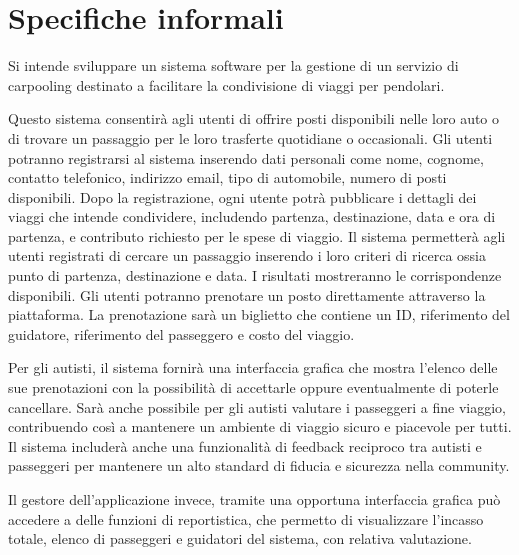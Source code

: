 \section {Specifiche informali}

Si intende sviluppare un sistema software per la gestione di un servizio di carpooling destinato a facilitare la condivisione di viaggi per pendolari. 

Questo sistema consentirà agli utenti di offrire posti disponibili nelle loro auto o di trovare un passaggio per le loro trasferte quotidiane o occasionali.
Gli utenti potranno registrarsi al sistema inserendo dati personali come nome, cognome, contatto telefonico, indirizzo email, tipo di automobile, numero di posti disponibili. Dopo la registrazione, ogni utente potrà pubblicare i dettagli dei viaggi che intende condividere, includendo partenza, destinazione, data e ora di partenza, e contributo richiesto per le spese di viaggio.
Il sistema permetterà agli utenti registrati di cercare un passaggio inserendo i loro criteri di ricerca ossia punto di partenza, destinazione e data. I risultati mostreranno le corrispondenze disponibili. Gli utenti potranno prenotare un posto direttamente attraverso la piattaforma. La prenotazione sarà un biglietto che contiene un ID, riferimento del guidatore, riferimento del passeggero e costo del viaggio.

Per gli autisti, il sistema fornirà una interfaccia grafica che mostra l’elenco delle sue prenotazioni con la possibilità di accettarle oppure eventualmente di poterle cancellare. Sarà anche possibile per gli autisti valutare i passeggeri a fine viaggio, contribuendo così a mantenere un ambiente di viaggio sicuro e piacevole per tutti.
Il sistema includerà anche una funzionalità di feedback reciproco tra autisti e passeggeri per mantenere un alto standard di fiducia e sicurezza nella community. 

Il gestore dell’applicazione invece, tramite una opportuna interfaccia grafica può accedere a delle funzioni di reportistica, che permetto di visualizzare l’incasso totale, elenco di passeggeri e guidatori del sistema, con relativa valutazione.